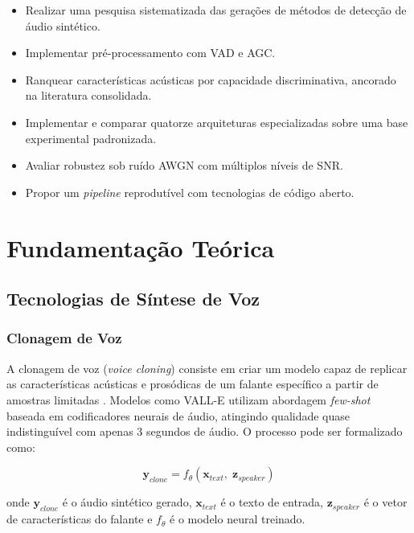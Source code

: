 \documentclass[12pt,a4paper]{article}
\begin{document}
\begin{itemize}
    \item Realizar uma pesquisa sistematizada das gerações de métodos de
    detecção de áudio sintético.
    \item Implementar pré-processamento com VAD e AGC.
    \item Ranquear características acústicas por capacidade discriminativa,
    ancorado na literatura consolidada.
    \item Implementar e comparar quatorze arquiteturas especializadas
    sobre uma base experimental padronizada.
    \item Avaliar robustez sob ruído AWGN com múltiplos níveis de SNR.
    \item Propor um \textit{pipeline} reprodutível com tecnologias de código
    aberto.
\end{itemize}

\section{Fundamentação Teórica}
\label{sec:fundamentacao}

\subsection{Tecnologias de Síntese de Voz}

\subsubsection{Clonagem de Voz}

A clonagem de voz (\textit{voice cloning}) consiste em criar um modelo capaz
de replicar as características acústicas e prosódicas de um falante específico
a partir de amostras limitadas \cite{muller2022warning}. Modelos como VALL-E
\cite{wang2023vall} utilizam abordagem \textit{few-shot} baseada em
codificadores neurais de áudio, atingindo qualidade quase indistinguível com
apenas 3 segundos de áudio. O processo pode ser formalizado como:

\begin{equation}
\label{eq:voice_clone}
\mathbf{y}_{clone} = f_{\theta}(\mathbf{x}_{text},\; \mathbf{z}_{speaker})
\end{equation}

\noindent
onde $\mathbf{y}_{clone}$ é o áudio sintético gerado, $\mathbf{x}_{text}$ é
o texto de entrada, $\mathbf{z}_{speaker}$ é o vetor de características do
falante e $f_{\theta}$ é o modelo neural treinado.
\end{document}
